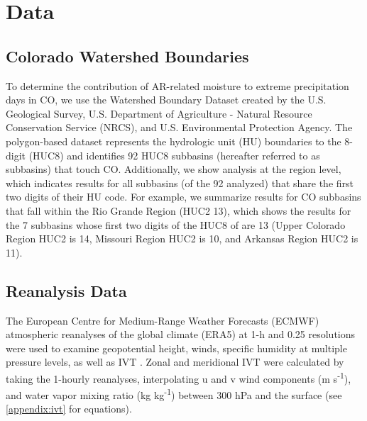 \documentclass[draft]{agujournal2019}
\begin{document}





\section{Data}
\label{sec:data}
\subsection{Colorado Watershed Boundaries}
To determine the contribution of AR-related moisture to extreme precipitation days in CO, we use the Watershed Boundary Dataset created by the U.S. Geological Survey, U.S. Department of Agriculture - Natural Resource Conservation Service (NRCS), and U.S. Environmental Protection Agency. The polygon-based dataset represents the hydrologic unit (HU) boundaries to the 8-digit (HUC8) and identifies 92 HUC8 subbasins (hereafter referred to as subbasins) that touch CO. Additionally, we show analysis at the region level, which indicates results for all subbasins (of the 92 analyzed) that share the first two digits of their HU code. For example, we summarize results for CO subbasins that fall within the Rio Grande Region (HUC2 13), which shows the results for the 7 subbasins whose first two digits of the HUC8 of are 13 (Upper Colorado Region HUC2 is 14, Missouri Region HUC2 is 10, and Arkansas Region HUC2 is 11).

\subsection{Reanalysis Data}

The European Centre for Medium-Range Weather Forecasts (ECMWF) atmospheric reanalyses of the global climate (ERA5) at 1-h and  0.25\textdegree{} resolutions were used to examine geopotential height, winds, specific humidity at multiple pressure levels, as well as IVT \cite{Hersbach2020}. Zonal and meridional IVT were calculated by taking the 1-hourly reanalyses, interpolating u and v wind components (m s\textsuperscript{-1}), and water vapor mixing ratio (kg kg\textsuperscript{-1}) between 300 hPa and the surface (see \ref{appendix:ivt} for equations).
\end{document}
